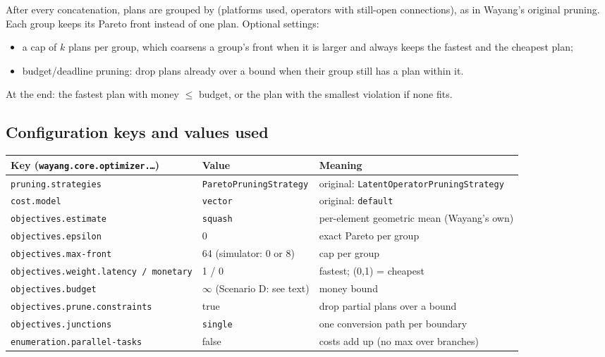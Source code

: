 \documentclass[10pt,a4paper]{article}
\begin{document}
After every concatenation, plans are grouped by (platforms used, operators with still-open connections), as in
Wayang's original pruning. Each group keeps its Pareto front instead of one plan. Optional settings:
\begin{itemize}
\item a cap of $k$ plans per group, which coarsens a group's front when it is larger and always keeps the fastest
and the cheapest plan;
\item budget/deadline pruning: drop plans already over a bound when their group still has a plan within it.
\end{itemize}
At the end: the fastest plan with money $\le$ budget, or the plan with the smallest violation if none fits.

\subsection{Configuration keys and values used}
\begin{center}\small
\begin{tabular}{@{}lll@{}}
\toprule
Key (\texttt{wayang.core.optimizer.\dots}) & Value & Meaning\\
\midrule
\texttt{pruning.strategies} & \texttt{ParetoPruningStrategy} & original: \texttt{LatentOperatorPruningStrategy}\\
\texttt{cost.model} & \texttt{vector} & original: \texttt{default}\\
\texttt{objectives.estimate} & \texttt{squash} & per-element geometric mean (Wayang's own)\\
\texttt{objectives.epsilon} & 0 & exact Pareto per group\\
\texttt{objectives.max-front} & 64 (simulator: 0 or 8) & cap per group\\
\texttt{objectives.weight.latency / monetary} & 1 / 0 & fastest; (0,1) = cheapest\\
\texttt{objectives.budget} & $\infty$ (Scenario D: see text) & money bound\\
\texttt{objectives.prune.constraints} & true & drop partial plans over a bound\\
\texttt{objectives.junctions} & \texttt{single} & one conversion path per boundary\\
\texttt{enumeration.parallel-tasks} & false & costs add up (no max over branches)\\
\bottomrule
\end{tabular}
\end{center}
\end{document}
